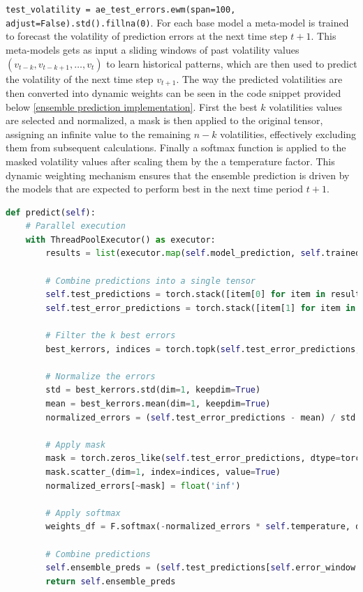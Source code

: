 \texttt{test\_volatility = ae\_test\_errors.ewm(span=100, adjust=False).std().fillna(0)}. 
For each base model a meta-model is trained to forecast the volatility of prediction errors at the next time step $t+1$. This meta-models gets as input a sliding windows of past volatility values $( v_{t-k}, v_{t-k+1}, \dots, v_t )$ to learn historical patterns, which are then used to predict the volatility of the next time step $v_{t+1}$. The way the predicted volatilities are then converted into dynamic weights can be seen in the code snippet provided below \ref{ensemble prediction implementation}. First the best $k$ volatilities values are selected and normalized, a mask is then applied to the original tensor, assigning an infinite value to the remaining $n-k$ volatilities, effectively excluding them from subsequent calculations. Finally a softmax function is applied to the masked volatility values after scaling them by the a temperature factor. This dynamic weighting mechanism ensures that the ensemble prediction is driven by the models that are expected to perform best in the next time period $t+1$. 
\label{ensemble prediction implementation}
\begin{lstlisting}[language=Python, caption=Ensemble Prediction Implementation]
def predict(self):
    # Parallel execution
    with ThreadPoolExecutor() as executor: 
        results = list(executor.map(self.model_prediction, self.trained_models)) 

        # Combine predictions into a single tensor
        self.test_predictions = torch.stack([item[0] for item in results], dim=1).squeeze()
        self.test_error_predictions = torch.stack([item[1] for item in results], dim=1).squeeze()

        # Filter the k best errors
        best_kerrors, indices = torch.topk(self.test_error_predictions, k=self.k, largest=False, sorted=False)

        # Normalize the errors
        std = best_kerrors.std(dim=1, keepdim=True)
        mean = best_kerrors.mean(dim=1, keepdim=True)
        normalized_errors = (self.test_error_predictions - mean) / std

        # Apply mask
        mask = torch.zeros_like(self.test_error_predictions, dtype=torch.bool)
        mask.scatter_(dim=1, index=indices, value=True)
        normalized_errors[~mask] = float('inf')
    
        # Apply softmax
        weights_df = F.softmax(-normalized_errors * self.temperature, dim=1)

        # Combine predictions
        self.ensemble_preds = (self.test_predictions[self.error_window:] * weights_df).sum(dim=1)
        return self.ensemble_preds
\end{lstlisting}
